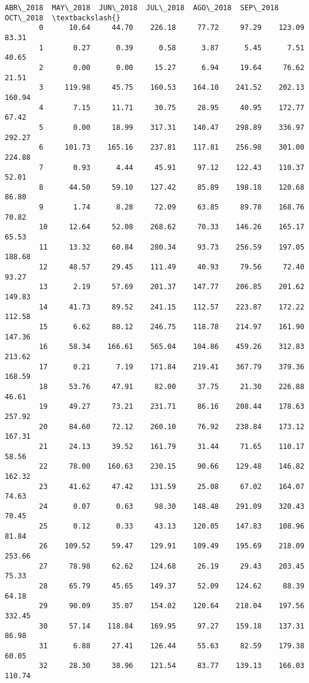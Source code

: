 \documentclass[11pt]{article}
\begin{document}
\begin{Verbatim}[commandchars=\\\{\}]
            ABR\_2018  MAY\_2018  JUN\_2018  JUL\_2018  AGO\_2018  SEP\_2018  OCT\_2018  \textbackslash{}
        0      10.64     44.70    226.18     77.72     97.29    123.09     83.31   
        1       0.27      0.39      0.58      3.87      5.45      7.51     40.65   
        2       0.00      0.00     15.27      6.94     19.64     76.62     21.51   
        3     119.98     45.75    160.53    164.10    241.52    202.13    160.94   
        4       7.15     11.71     30.75     28.95     40.95    172.77     67.42   
        5       0.00     18.99    317.31    140.47    298.89    336.97    292.27   
        6     101.73    165.16    237.81    117.81    256.98    301.00    224.88   
        7       0.93      4.44     45.91     97.12    122.43    110.37     52.01   
        8      44.50     59.10    127.42     85.89    198.18    120.68     86.80   
        9       1.74      8.28     72.09     63.85     89.78    168.76     70.82   
        10     12.64     52.08    268.62     70.33    146.26    165.17     65.53   
        11     13.32     60.84    280.34     93.73    256.59    197.05    188.68   
        12     48.57     29.45    111.49     40.93     79.56     72.40     93.27   
        13      2.19     57.69    201.37    147.77    206.85    201.62    149.83   
        14     41.73     89.52    241.15    112.57    223.87    172.22    112.58   
        15      6.62     80.12    246.75    118.78    214.97    161.90    147.36   
        16     58.34    166.61    565.04    104.86    459.26    312.83    213.62   
        17      0.21      7.19    171.84    219.41    367.79    379.36    168.59   
        18     53.76     47.91     82.00     37.75     21.30    226.88     46.61   
        19     49.27     73.21    231.71     86.16    208.44    178.63    257.92   
        20     84.60     72.12    260.10     76.92    238.84    173.12    167.31   
        21     24.13     39.52    161.79     31.44     71.65    110.17     58.56   
        22     78.00    160.63    230.15     90.66    129.48    146.82    162.32   
        23     41.62     47.42    131.59     25.08     67.02    164.07     74.63   
        24      0.07      0.63     98.30    148.48    291.09    320.43     70.45   
        25      0.12      0.33     43.13    120.05    147.83    108.96     81.84   
        26    109.52     59.47    129.91    109.49    195.69    218.09    253.66   
        27     78.98     62.62    124.68     26.19     29.43    203.45     75.33   
        28     65.79     45.65    149.37     52.09    124.62     88.39     64.18   
        29     90.09     35.07    154.02    120.64    218.04    197.56    332.45   
        30     57.14    118.84    169.95     97.27    159.18    137.31     86.98   
        31      6.88     27.41    126.44     55.63     82.59    179.38     60.05   
        32     28.30     38.96    121.54     83.77    139.13    166.03    110.74   
        

\end{Verbatim}
\end{document}
